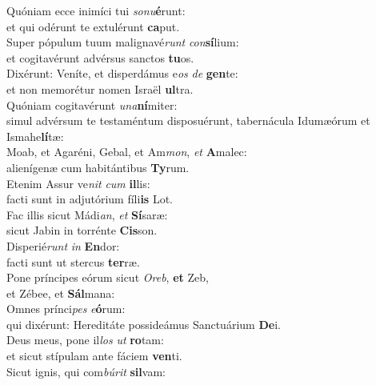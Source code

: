 \evenverse Quóniam ecce inimíci tui \textit{so}\textit{nu}\textbf{é}runt:~\*\\
\evenverse et qui odérunt te extulérunt \textbf{ca}put.\\
\oddverse Super pópulum tuum malignavé\textit{runt} \textit{con}\textbf{sí}lium:~\*\\
\oddverse et cogitavérunt advérsus sanctos \textbf{tu}os.\\
\evenverse Dixérunt: Veníte, et disperdámus e\textit{os} \textit{de} \textbf{gen}te:~\*\\
\evenverse et non memorétur nomen Israël \textbf{ul}tra.\\
\oddverse Quóniam cogitavérunt \textit{u}\textit{na}\textbf{ní}miter:~\*\\
\oddverse simul advérsum te testaméntum disposuérunt, tabernácula Idumæórum et Ismahe\textbf{lí}tæ:\\
\evenverse Moab, et Agaréni, Gebal, et Am\textit{mon}, \textit{et} \textbf{A}malec:~\*\\
\evenverse alienígenæ cum habitántibus \textbf{Ty}rum.\\
\oddverse Etenim Assur ve\textit{nit} \textit{cum} \textbf{il}lis:~\*\\
\oddverse facti sunt in adjutórium fíli\textbf{is} Lot.\\
\evenverse Fac illis sicut Mádi\textit{an}, \textit{et} \textbf{Sí}saræ:~\*\\
\evenverse sicut Jabin in torrénte \textbf{Cis}son.\\
\oddverse Disperié\textit{runt} \textit{in} \textbf{En}dor:~\*\\
\oddverse facti sunt ut stercus \textbf{ter}ræ.\\
\evenverse Pone príncipes eórum sicut \textit{O}\textit{reb}, \textbf{et} Zeb,~\*\\
\evenverse et Zébee, et \textbf{Sál}mana:\\
\oddverse Omnes prínci\textit{pes} \textit{e}\textbf{ó}rum:~\*\\
\oddverse qui dixérunt: Hereditáte possideámus Sanctuárium \textbf{De}i.\\
\evenverse Deus meus, pone il\textit{los} \textit{ut} \textbf{ro}tam:~\*\\
\evenverse et sicut stípulam ante fáciem \textbf{ven}ti.\\
\oddverse Sicut ignis, qui com\textit{bú}\textit{rit} \textbf{sil}vam:~\*\\
